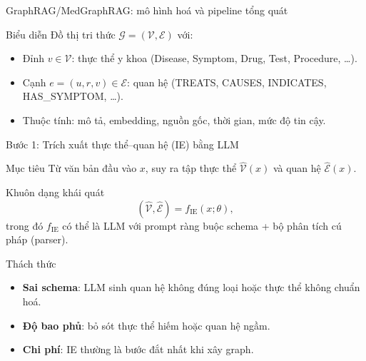 \documentclass[aspectratio=169,10pt]{beamer}
\newcommand{\G}{\mathcal{G}}
\newcommand{\E}{\mathcal{E}}
\newcommand{\V}{\mathcal{V}}
\begin{document}
\begin{frame}{GraphRAG/MedGraphRAG: mô hình hoá và pipeline tổng quát}
\small
\begin{block}{Biểu diễn}
Đồ thị tri thức \(\G=(\V,\E)\) với:
\begin{itemize}
  \item Đỉnh \(v\in\V\): thực thể y khoa (Disease, Symptom, Drug, Test, Procedure, \ldots).
  \item Cạnh \(e=(u,r,v)\in\E\): quan hệ (TREATS, CAUSES, INDICATES, HAS\_SYMPTOM, \ldots).
  \item Thuộc tính: mô tả, embedding, nguồn gốc, thời gian, mức độ tin cậy.
\end{itemize}
\end{block}

\begin{center}
\end{center}
\end{frame}

\begin{frame}{Bước 1: Trích xuất thực thể--quan hệ (IE) bằng LLM}
\small
\begin{block}{Mục tiêu}
Từ văn bản đầu vào \(x\), suy ra tập thực thể \(\hat{\V}(x)\) và quan hệ \(\hat{\E}(x)\).
\end{block}

\begin{block}{Khuôn dạng khái quát}
\[
(\hat{\V},\hat{\E}) = f_{\text{IE}}(x;\theta),
\]
trong đó \(f_{\text{IE}}\) có thể là LLM với prompt ràng buộc schema + bộ phân tích cú pháp (parser).
\end{block}

\begin{block}{Thách thức}
\begin{itemize}
  \item \textbf{Sai schema}: LLM sinh quan hệ không đúng loại hoặc thực thể không chuẩn hoá.
  \item \textbf{Độ bao phủ}: bỏ sót thực thể hiếm hoặc quan hệ ngầm.
  \item \textbf{Chi phí}: IE thường là bước đắt nhất khi xây graph.
\end{itemize}
\end{block}
\end{frame}
\end{document}
